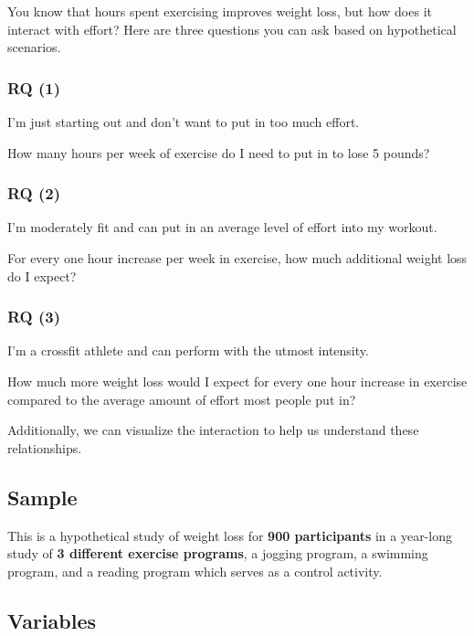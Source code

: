 \documentclass[
]{article}
\begin{document}
You know that hours spent exercising improves weight loss, but how does
it interact with effort? Here are three questions you can ask based on
hypothetical scenarios.

\hypertarget{rq-1}{%
\subsubsection{RQ (1)}\label{rq-1}}

I'm just starting out and don't want to put in too much effort.

How many hours per week of exercise do I need to put in to lose 5
pounds?

\hypertarget{rq-2}{%
\subsubsection{RQ (2)}\label{rq-2}}

I'm moderately fit and can put in an average level of effort into my
workout.

For every one hour increase per week in exercise, how much additional
weight loss do I expect?

\hypertarget{rq-3}{%
\subsubsection{RQ (3)}\label{rq-3}}

I'm a crossfit athlete and can perform with the utmost intensity.

How much more weight loss would I expect for every one hour increase in
exercise compared to the average amount of effort most people put in?

Additionally, we can visualize the interaction to help us understand
these relationships.

\clearpage

\hypertarget{sample}{%
\subsection{Sample}\label{sample}}

This is a hypothetical study of weight loss for \textbf{900
participants} in a year-long study of \textbf{3 different exercise
programs}, a jogging program, a swimming program, and a reading program
which serves as a control activity.

\hypertarget{variables}{%
\subsection{Variables}\label{variables}}
\end{document}
